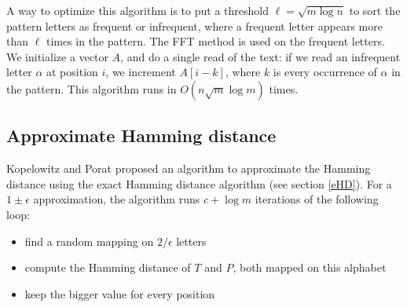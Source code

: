 \documentclass[preprint,12pt]{elsarticle}
\begin{document}
A way to optimize this algorithm is to put a threshold $\ell = \sqrt{m \log n}$
to sort the pattern letters as frequent or infrequent,
where a frequent letter appears more than $\ell$ times in the pattern.
The FFT method is used on the frequent letters.
We initialize a vector $A$, and do a single read of the text:
if we read an infrequent letter $\alpha$ at position $i$, we increment $A[i-k]$,
where $k$ is every occurrence of $\alpha$ in the pattern.
This algorithm runs in $O(n \sqrt{m} \log m)$ times.









\subsection{Approximate Hamming distance}

Kopelowitz and Porat \cite{ApproxHD} proposed an algorithm to approximate the Hamming distance
using the exact Hamming distance algorithm (see section \ref{eHD}).
For a $1 \pm \epsilon$ approximation,
the algorithm runs $c+\log m$ iterations of the following loop:
\begin{itemize}
\setlength\itemsep{0.1em}
\item find a random mapping on $2 / \epsilon$ letters
\item compute the Hamming distance of $T$ and $P$, both mapped on this alphabet
\item keep  the bigger value for every position
\end{itemize}
\end{document}

